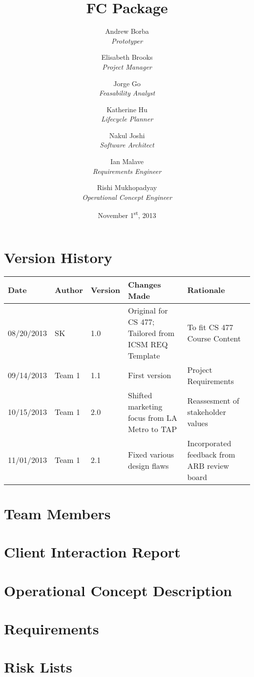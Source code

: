 \documentclass[titlepage]{article}
\title{FC Package}
\author{
	Andrew Borba\\ \emph{Prototyper}	\and
	 Elisabeth Brooks\\ \emph{Project Manager}	\and
	 Jorge Go\\ \emph{Feasability Analyst}	\and
	 Katherine Hu\\ \emph{Lifecycle Planner}	\and
	 Nakul Joshi\\ \emph{Software Architect}	\and
	 Ian Malave\\ \emph{Requirements Engineer}	\and
	 Rishi Mukhopadyay\\ \emph{Operational Concept Engineer}
}
\date{November 1\textsuperscript{st}, 2013}
\begin{document}
\pagestyle{fancy}
\chead{}
\lfoot{}
\cfoot{\thepage}
\rfoot{}

\maketitle
\tableofcontents
\newpage
\section{Version History}
\begin{table}[h]
	\centering
	\begin{tabularx}{\textwidth}{lllXX}
		\hline
		Date		& Author	& Version	& Changes Made											& Rationale                    \\ \hline
		08/20/2013	& SK		& 1.0		& Original for CS 477; Tailored from ICSM REQ Template	& To fit CS 477 Course Content \\ 
		09/14/2013	& Team 1	& 1.1 		& First version											& Project Requirements			\\
		10/15/2013	& Team 1	& 2.0 		& Shifted marketing focus from LA Metro to TAP			& Reassesment of stakeholder values\\
		11/01/2013	& Team 1	& 2.1		& Fixed various design flaws											& Incorporated feedback from ARB review board
	\end{tabularx}
\end{table}
\newpage

\section{Team Members}

\newpage

\section{Client Interaction Report}

\newpage

\section{Operational Concept Description}

\newpage

\section{Requirements}

\newpage

\section{Risk Lists}

		
\end{document}

